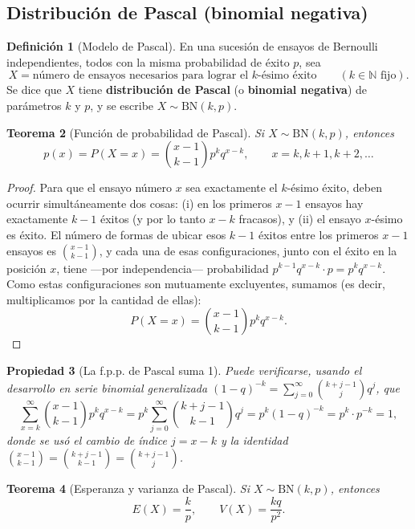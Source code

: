 \documentclass[11pt,a4paper]{article}
\theoremstyle{plain}
\newtheorem{teorema}{Teorema}[section]
\newtheorem{propiedad}[teorema]{Propiedad}
\theoremstyle{definition}
\newtheorem{definicion}[teorema]{Definición}
\theoremstyle{remark}
\begin{document}
\subsection{Distribución de Pascal (binomial negativa)}

\begin{definicion}[Modelo de Pascal]
En una sucesión de ensayos de Bernoulli independientes, todos con la misma probabilidad de éxito $p$, sea
$$X=\text{número de ensayos necesarios para lograr el $k$-ésimo éxito}\qquad(k\in\mathbb{N}\text{ fijo}).$$
Se dice que $X$ tiene \textbf{distribución de Pascal} (o \textbf{binomial negativa}) de parámetros $k$ y $p$, y se escribe $X\sim\text{BN}(k,p)$.
\end{definicion}

\begin{teorema}[Función de probabilidad de Pascal]
Si $X\sim\text{BN}(k,p)$, entonces
$$p(x)=P(X=x)=\binom{x-1}{k-1}p^kq^{x-k},\qquad x=k,k+1,k+2,\dots$$
\end{teorema}

\begin{proof}
Para que el ensayo número $x$ sea exactamente el $k$-ésimo éxito, deben ocurrir simultáneamente dos cosas: (i) en los primeros $x-1$ ensayos hay exactamente $k-1$ éxitos (y por lo tanto $x-k$ fracasos), y (ii) el ensayo $x$-ésimo es éxito. El número de formas de ubicar esos $k-1$ éxitos entre los primeros $x-1$ ensayos es $\binom{x-1}{k-1}$, y cada una de esas configuraciones, junto con el éxito en la posición $x$, tiene —por independencia— probabilidad $p^{k-1}q^{x-k}\cdot p=p^kq^{x-k}$. Como estas configuraciones son mutuamente excluyentes, sumamos (es decir, multiplicamos por la cantidad de ellas):
$$P(X=x)=\binom{x-1}{k-1}p^kq^{x-k}.$$
\end{proof}

\begin{propiedad}[La f.p.p. de Pascal suma 1]
Puede verificarse, usando el desarrollo en serie binomial generalizada $(1-q)^{-k}=\sum_{j=0}^\infty\binom{k+j-1}{j}q^j$, que
$$\sum_{x=k}^\infty\binom{x-1}{k-1}p^kq^{x-k}=p^k\sum_{j=0}^\infty\binom{k+j-1}{k-1}q^j=p^k(1-q)^{-k}=p^k\cdot p^{-k}=1,$$
donde se usó el cambio de índice $j=x-k$ y la identidad $\binom{x-1}{k-1}=\binom{k+j-1}{k-1}=\binom{k+j-1}{j}$.
\end{propiedad}

\begin{teorema}[Esperanza y varianza de Pascal]
Si $X\sim\text{BN}(k,p)$, entonces
$$E(X)=\frac{k}{p}, \qquad V(X)=\frac{kq}{p^2}.$$
\end{teorema}
\end{document}
